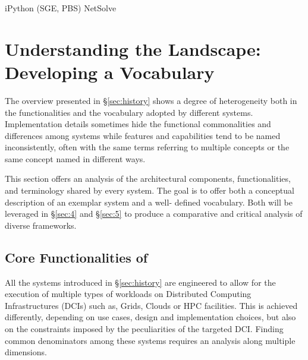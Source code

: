 \documentclass{sig-alternate}
\begin{document}
iPython (SGE, PBS)
NetSolve~\cite{Casanova:1995:NNS:898848}

\section{Understanding the Landscape: Developing a Vocabulary}
\label{sec:vocab}

The overview presented in \S\ref{sec:history} shows a degree of heterogeneity
both in the functionalities and the vocabulary adopted by different \pilotjob
systems. Implementation details sometimes hide the functional commonalities and
differences among \pilotjobs systems while features and capabilities tend to be
named inconsistently, often with the same terms referring to multiple concepts or the same
concept named in different ways.

This section offers an analysis of the architectural components,
functionalities, and terminology shared by every \pilotjob system. The goal is to
offer both a conceptual description of an exemplar \pilotjob system and a well-
defined vocabulary. Both will be leveraged in \S\ref{sec:4} and \S\ref{sec:5}
to produce a comparative and critical analysis of diverse \pilotjob frameworks.

\subsection{Core Functionalities of \pilotjobs}
\label{subsec:vocab_core_functionalities}



All the \pilotjob systems introduced in \S\ref{sec:history} are engineered to
allow for the execution of multiple types of workloads on Distributed Computing
Infrastructures (DCIs) such as, Grids, Clouds or HPC facilities. This is
achieved differently, depending on use cases, design and implementation
choices, but also on the constraints imposed by the peculiarities of the
targeted DCI. Finding common denominators among these systems requires an
analysis along multiple dimensions.
\end{document}
